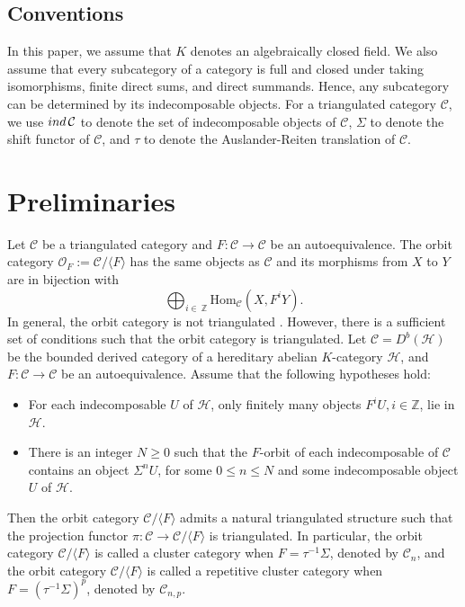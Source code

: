 \documentclass[a4paper,reqno,11pt]{amsart}
\theoremstyle{definition}
\def\C{\mathcal{C}}
\def\H{\mathcal {H}}
\providecommand{\ind}{\mathop{\rm ind}\nolimits}%
\begin{document}

\subsection*{Conventions}
In this paper, we assume that $K$ denotes an algebraically closed field. We also assume that every subcategory of a category is full and closed under taking isomorphisms, finite direct sums, and direct summands. Hence, any subcategory can be determined by its indecomposable objects.
For  a triangulated category $\C$, we use $\ind\C$ to denote the set of indecomposable objects of $\C$,  $\Sigma$ to denote the shift functor of $\C$, and $\tau$  to denote the Auslander-Reiten translation of $\C$.


\section{Preliminaries}
Let $\C$ be a triangulated category and $F\colon \C\rightarrow \C$ be an autoequivalence. The orbit category $\mathcal O_{F}:= \C/\langle F\rangle$ has the same objects as $\C$ and its morphisms from $X$ to $Y$ are in bijection with
$$\bigoplus_{i\in\ \mathbb{Z}} \mathrm{Hom}_{\C}(X,F^{i}Y).$$
In general, the orbit category is not triangulated \cite{K}. However, there is a sufficient set of conditions such that the orbit category is triangulated. Let $\C=D^b(\H)$ be the bounded derived category of a hereditary abelian $K$-category $\H$, and $F\colon \C\rightarrow \C$ be an autoequivalence.  Assume that the following hypotheses hold:
\begin{itemize}
  \item [(g1)] For each indecomposable $U$ of $\H$, only finitely many objects $F^iU, i\in\mathbb{Z}$,
lie in $\H$.
  \item [(g2)] There is an integer $N\geq 0$ such that the $F$-orbit of each indecomposable of
$\C$ contains an object $\Sigma^n U$, for some $0\leq n\leq N$ and some indecomposable object $U$ of $\H$.
\end{itemize}
Then the orbit category $\C/\langle F\rangle$ admits a natural triangulated structure such that
the projection functor $\pi\colon\C\rightarrow\C/\langle F\rangle$ is triangulated. In particular, the orbit category $\C/\langle F\rangle$ is called a cluster category when $F=\tau^{-1}\Sigma$, denoted by $\C_{n}$, and the orbit category $\C/\langle F\rangle$ is called a repetitive cluster category when $F=(\tau^{-1}\Sigma)^p$, denoted by $\C_{n,p}$.
\end{document}
